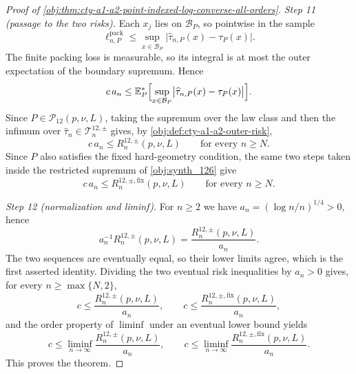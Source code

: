 \documentclass[11pt]{article}
\begin{document}
\begin{proof}[Proof of \cref{obj:thm:cty-a1-a2-point-indexed-log-converse-all-orders}]
\emph{Step 11 (passage to the two risks).}
Each \(x_j\) lies on \(\mathcal B_P\), so pointwise in the sample
\[
\ell^{\mathrm{pack}}_{n,P}
\leq
\sup_{x\in\mathcal B_P}\bigl|\widehat\tau_{n,P}(x)-\tau_P(x)\bigr| .
\]
The finite packing loss is measurable, so its integral is at most the outer
expectation of the boundary supremum.  Hence
\[
c\,a_n
\leq
\mathbb E_P^*\Bigl[\sup_{x\in\mathcal B_P}
\bigl|\widehat\tau_{n,P}(x)-\tau_P(x)\bigr|\Bigr].
\]
Since \(P\in\mathcal P_{12}(p,\nu,L)\), taking the supremum over the law class
and then the infimum over \(\widehat\tau_n\in\mathcal T^{12,\pm}_n\) gives, by
\cref{obj:def:cty-a1-a2-outer-risk},
\[
c\,a_n\leq R_n^{12,\pm}(p,\nu,L)
\qquad\text{for every }n\geq N .
\]
Since \(P\) also satisfies the fixed hard-geometry condition, the same two
steps taken inside the restricted supremum of \cref{obj:synth_126} give
\[
c\,a_n\leq R_n^{12,\pm,\mathrm{fix}}(p,\nu,L)
\qquad\text{for every }n\geq N .
\]

\emph{Step 12 (normalization and liminf).}
For \(n\geq2\) we have \(a_n=(\log n/n)^{1/4}>0\), hence
\[
a_n^{-1}R_n^{12,\pm}(p,\nu,L)
=
\frac{R_n^{12,\pm}(p,\nu,L)}{a_n}.
\]
The two sequences are eventually equal, so their lower limits agree, which is
the first asserted identity.
Dividing the two eventual risk inequalities by \(a_n>0\) gives, for every
\(n\geq\max\{N,2\}\),
\[
c\leq\frac{R_n^{12,\pm}(p,\nu,L)}{a_n},
\qquad
c\leq\frac{R_n^{12,\pm,\mathrm{fix}}(p,\nu,L)}{a_n},
\]
and the order property of \(\liminf\) under an eventual lower bound yields
\[
c\leq\liminf_{n\to\infty}\frac{R_n^{12,\pm}(p,\nu,L)}{a_n},
\qquad
c\leq\liminf_{n\to\infty}\frac{R_n^{12,\pm,\mathrm{fix}}(p,\nu,L)}{a_n}.
\]
This proves the theorem. %
\end{proof}
\end{document}
